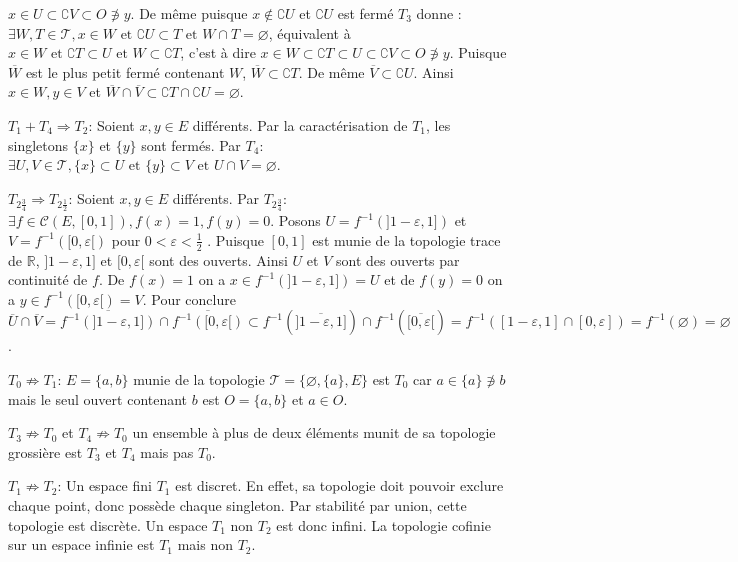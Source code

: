 \documentclass[a4paper, 11pt, french]{book}
\newenvironment{itemise}{\itemize}{\enditemize}
\theoremstyle{plain} %
\theoremstyle{definition} %
\theoremstyle{remark} %
\newcommand{\1}{\mathds{1}}
\newcommand\vide{\varnothing}
\newcommand{\cont}{\mathcal{C}}
\newcommand{\inv}[1]{#1^{-1}}
\newcommand\et{\text{ et }}
\newcommand{\R}{\mathbb{R}}
\begin{document}
\begin{itemise}
	$x\in U\subset\complement V\subset O\not\ni y$.
	De même puisque $x\notin\complement U$ et $\complement U$ est fermé $T_3$ donne :
	$\exists W, T\in\mathscr{T}, x\in W\et\complement U\subset T\et W\cap T=\vide$, équivalent à
	$x\in W\et\complement T\subset U\et W\subset\complement T$, c'est à dire
	$x\in W\subset\complement T\subset U\subset\complement V\subset O\not\ni y$.
	Puisque $\overline{W}$ est le plus petit fermé contenant $W$, $\overline{W}\subset\complement T$.
	De même $\overline{V}\subset\complement U$.
	Ainsi $x\in W, y\in V$ et $\overline{W}\cap\overline{V}\subset\complement T\cap\complement U=\vide$.
	\item[$T_1+T_4\Rightarrow T_2$:] Soient $x, y\in E$ différents.
	Par la caractérisation de $T_1$, les singletons $\{x\}$ et $\{y\}$ sont fermés.
	Par $T_4$: $\exists U, V\in\mathscr{T}, \{x\}\subset U\et\{y\}\subset V\et U\cap V=\vide$.
	\item[$T_{2\frac{3}{4}}\Rightarrow T_{2\frac{1}{2}}$:] Soient $x, y\in E$ différents.
	Par $T_{2\frac{3}{4}}$: $\exists f\in\cont(E, [0, 1]), f(x)=1, f(y)=0$.
	Posons $U=\inv{f}(]1-\varepsilon, 1])$ et $V=\inv{f}([0, \varepsilon[)$ pour $0<\varepsilon<\frac{1}{2}$ .
	Puisque $[0, 1]$ est munie de la topologie trace de $\R$, $]1-\varepsilon, 1]$ et $[0, \varepsilon[$ sont des ouverts.
	Ainsi $U$ et $V$ sont des ouverts par continuité de $f$.
	De $f(x)=1$ on a $x\in\inv{f}(]1-\varepsilon, 1])=U$ et de $f(y)=0$ on a $y\in\inv{f}([0, \varepsilon[)=V$.
	Pour conclure
	$\overline{U}\cap\overline{V}
   =\overline{\inv{f}(]1-\varepsilon, 1])}\cap\overline{\inv{f}([0, \varepsilon[)}
	\subset\inv{f}(\overline{]1-\varepsilon, 1]})\cap\inv{f}(\overline{[0, \varepsilon[})
   =\inv{f}([1-\varepsilon, 1]\cap[0, \varepsilon])
   =\inv{f}(\vide)
   =\vide$.
	\item[$T_0\not\Rightarrow T_1$:] $E=\{a, b\}$ munie de la topologie $\mathscr{T}=\{\vide, \{a\}, E\}$ est $T_0$ car $a\in\{a\}\not\ni b$ mais le seul ouvert contenant $b$ est $O=\{a, b\}$ et $a\in O$.
	\item[$T_3\not\Rightarrow T_0$ et $T_4\not\Rightarrow T_0$] un ensemble à plus de deux éléments munit de sa topologie grossière est $T_3$ et $T_4$ mais pas $T_0$.
	\item[$T_1\not\Rightarrow T_2$:] Un espace fini $T_1$ est discret.
	En effet, sa topologie doit pouvoir exclure chaque point, donc possède chaque singleton.
	Par stabilité par union, cette topologie est discrète.
	Un espace $T_1$ non $T_2$ est donc infini.
	La topologie cofinie sur un espace infinie est $T_1$ mais non $T_2$.

\end{itemise}
\end{document}
